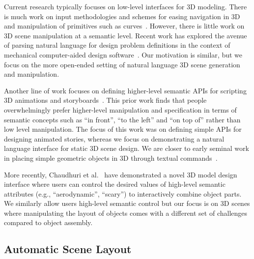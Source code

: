 \documentclass{sigchi}
\begin{document}
Current research typically focuses on low-level interfaces for 3D modeling.  There is much work on input methodologies and schemes for easing navigation in 3D~\cite{khan2008viewcube,mccrae2009multiscale} and manipulation of primitives such as curves~\cite{owen2005gets}.  However, there is little work on 3D scene manipulation at a semantic level.  Recent work has explored the avenue of parsing natural language for design problem definitions in the context of mechanical computer-aided design software~\cite{cheong2014natural}.  Our motivation is similar, but we focus on the more open-ended setting of natural language 3D scene generation and manipulation.


Another line of work focuses on defining higher-level semantic APIs for scripting 3D animations and storyboards~\cite{conway2000alice,kelleher2006lessons}.  This prior work finds that people overwhelmingly prefer higher-level manipulation and specification in terms of semantic concepts such as ``in front'', ``to the left'' and ``on top of'' rather than low level manipulation.  The focus of this work was on defining simple APIs for designing animated stories, whereas we focus on demonstrating a natural language interface for static 3D scene design.  We are closer to early seminal work in placing simple geometric objects in 3D through textual commands~\cite{clay1996put}.

More recently, Chaudhuri et al.~ have demonstrated a novel 3D model design interface where users can control the desired values of high-level semantic attributes (e.g., ``aerodynamic'', ``scary'') to interactively combine object parts.  We similarly allow users high-level semantic control but our focus is on 3D scenes where manipulating the layout of objects comes with a different set of challenges compared to object assembly.

\subsection{Automatic Scene Layout}
\end{document}

